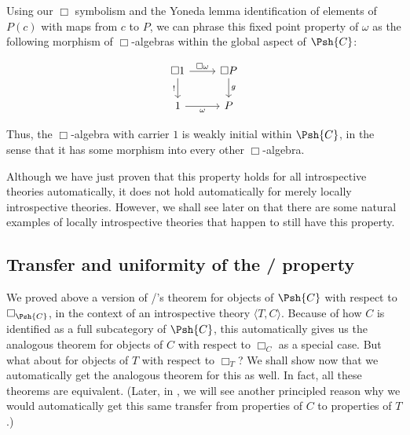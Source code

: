 Using our $\Box$ symbolism and the Yoneda lemma identification of elements of $P(c)$ with maps from $c$ to $P$, we can phrase this fixed point property of $\omega$ as the following morphism of $\Box$-algebras within the global aspect of $\Psh{C}$:

\[\begin{tikzcd}
	{\Box 1} & {\Box P} \\
	1 & P
	\arrow["{!}"', from=1-1, to=2-1]
	\arrow["{\Box \omega}", from=1-1, to=1-2]
	\arrow["g", from=1-2, to=2-2]
	\arrow["\omega"', from=2-1, to=2-2]
\end{tikzcd}\]

Thus, the $\Box$-algebra with carrier $1$ is weakly initial within $\Psh{C}$, in the sense that it has some morphism into every other $\Box$-algebra.

Although we have just proven that this property holds for all introspective theories automatically, it does not hold automatically for merely locally introspective theories. However, we shall see later on that there are some natural examples of locally introspective theories that happen to still have this property. 

\subsection{Transfer and uniformity of the \Loeb/ property}
We proved above a version of \Loeb/'s theorem for objects of $\Psh{C}$ with respect to $\Box_{\Psh{C}}$, in the context of an introspective theory $\langle T, C \rangle$. Because of how $C$ is identified as a full subcategory of $\Psh{C}$, this automatically gives us the analogous theorem for objects of $C$ with respect to $\Box_C$ as a special case. But what about for objects of $T$ with respect to $\Box_T$? We shall show now that we automatically get the analogous theorem for this as well. In fact, all these theorems are equivalent. (Later, in , we will see another principled reason why we would automatically get this same transfer from properties of $C$ to properties of $T$.)


